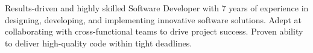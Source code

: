 
\begin{cvparagraph}
Results-driven and highly skilled Software Developer with 7 years of experience in designing, developing, and implementing innovative software solutions. Adept at collaborating with cross-functional teams to drive project success. Proven ability to deliver high-quality code within tight deadlines.
\end{cvparagraph}
